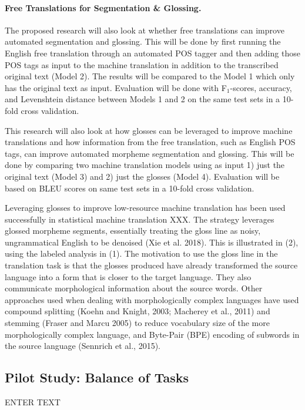 \paragraph{Free Translations for Segmentation \& Glossing.}
The proposed research will also look at whether free translations can improve automated segmentation and glossing. This will be done by first running the English free translation through an automated POS tagger and then adding those POS tags as input to the machine translation in addition to the transcribed original text (Model 2). The results will be compared to the Model 1 which only has the original text as input. Evaluation will be done with F$_1$-scores, accuracy, and Levenshtein distance between Models 1 and 2 on the same test sets in a 10-fold cross validation. 

This research will also look at how glosses can be leveraged to improve machine translations and how information from the free translation, such as English POS tags, can improve automated morpheme segmentation and glossing. This will be done by comparing two machine translation models using as input 1) just the original text (Model 3) and 2) just the glosses (Model 4). Evaluation will be based on BLEU scores on same test sets in a 10-fold cross validation. 

Leveraging glosses to improve low-resource machine translation has been used successfully in statistical machine translation XXX. The strategy leverages glossed morpheme segments, essentially treating the gloss line as noisy, ungrammatical English to be denoised (Xie et al. 2018). This is illustrated in (2), using the labeled analysis in (1). The motivation to use the gloss line in the translation task is that the glosses produced have already transformed the source language into a form that is closer to the target language. They also communicate morphological information about the source words. Other approaches used when dealing with morphologically complex languages have used compound splitting (Koehn and Knight, 2003; Macherey et al., 2011) and stemming (Fraser and Marcu 2005) to reduce vocabulary size of the more morphologically complex language, and Byte-Pair (BPE) encoding of subwords in the source language (Sennrich et al., 2015). 

\subsection{Pilot Study: Balance of Tasks}

ENTER TEXT
